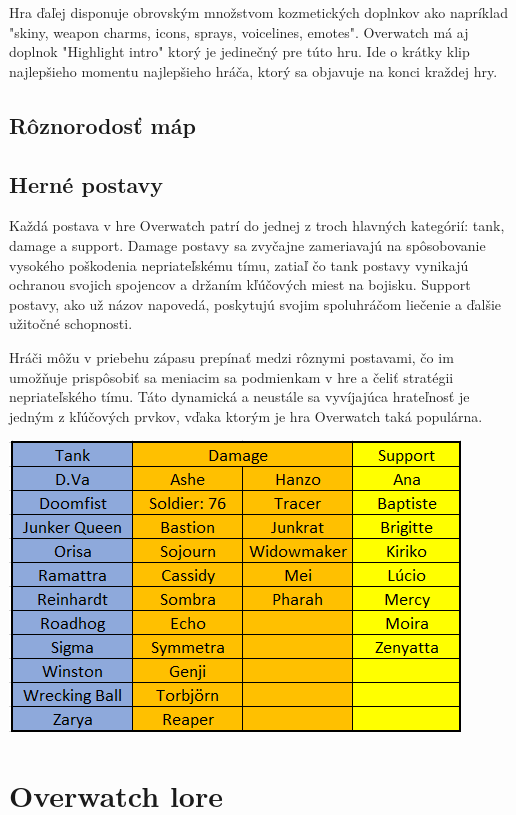 \documentclass[10pt,oneside,slovak,a4paper]{article}
\begin{document}
Hra ďaľej disponuje obrovským množstvom kozmetických doplnkov ako napríklad "skiny, weapon charms, icons, sprays, voicelines, emotes". Overwatch
má aj doplnok "Highlight intro" ktorý je jedinečný pre túto hru. Ide o krátky klip najlepšieho momentu najlepšieho hráča, ktorý sa objavuje na konci kraždej hry.




\subsection{Rôznorodosť máp} \label{Rôznorodosť máp}




\subsection{Herné postavy} \label{Herné postavy}

Každá postava v hre Overwatch patrí do jednej z troch hlavných kategórií: tank, damage a support. Damage postavy sa zvyčajne zameriavajú na spôsobovanie vysokého poškodenia nepriateľskému tímu, zatiaľ čo tank postavy vynikajú ochranou svojich spojencov a držaním kľúčových miest na bojisku. Support postavy, ako už názov napovedá, poskytujú svojim spoluhráčom liečenie a ďalšie užitočné schopnosti.

Hráči môžu v priebehu zápasu prepínať medzi rôznymi postavami, čo im umožňuje prispôsobiť sa meniacim sa podmienkam v hre a čeliť stratégii nepriateľského tímu. Táto dynamická a neustále sa vyvíjajúca hrateľnosť je jedným z kľúčových prvkov, vďaka ktorým je hra Overwatch taká populárna.

\includegraphics[scale=1.25]{images/overwatch_postavy.png}

\section{Overwatch lore} \label{Overwatch lore}
\end{document}
